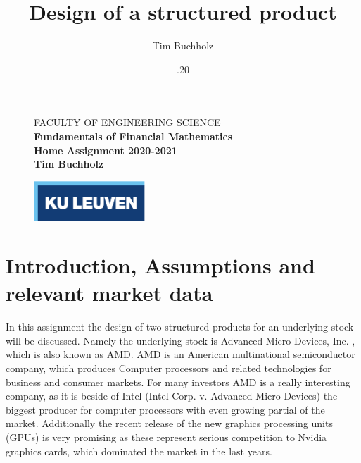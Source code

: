 \documentclass[11pt,oneside,a4paper]{article}
\title{\vspace*{40.0mm}
	\bf\sf Design of a structured product
	\vspace*{20.0mm} \\
	\vspace*{40.0mm}
}
\author{\sf Tim Buchholz}
\date{\sf 21.10.20}
\makeatletter
\def\cleardoublepage{\clearpage\if@twoside \ifodd\c@page\else%
	\hbox{}%
	\thispagestyle{empty}%
	\clearpage%
	\if@twocolumn\hbox{}\clearpage\fi\fi\fi}
\makeatother
\begin{document}
	
	\begin{figure}
		\parbox[t]{125mm}{
			\vspace*{6mm}
			\scriptsize\sf           FACULTY OF ENGINEERING SCIENCE\\
			\scriptsize\sf\bfseries  Fundamentals of Financial Mathematics \\
			\scriptsize\sf           Home Assignment 2020-2021 \\
			\scriptsize\sf           Tim Buchholz}
		\parbox[t]{40mm}{
			\begin{flushright}
				\includegraphics[height=15mm]{logo-eps-converted-to.pdf}
		\end{flushright}}
	\end{figure}
	
	\maketitle
	\thispagestyle{empty}
	\raggedbottom
	
	\cleardoublepage
	\setcounter{tocdepth}{2}
	
	\tableofcontents
	
	\cleardoublepage
	
	\section{Introduction, Assumptions and relevant market data}
	In this assignment the design of two structured products for an underlying stock will be discussed. Namely the underlying stock is Advanced Micro Devices, Inc. , which is also known as AMD. AMD is an American multinational semiconductor company, which produces Computer processors and related technologies for business and consumer markets. 
	For many investors AMD is a really interesting company, as it is beside of Intel (Intel Corp. v. Advanced Micro Devices) the biggest producer for computer processors with even growing partial of the market. 
	Additionally the recent release of the new graphics processing units (GPUs) is very promising as these represent serious competition to Nvidia graphics cards, which dominated the market in the last years.
	
\end{document}
